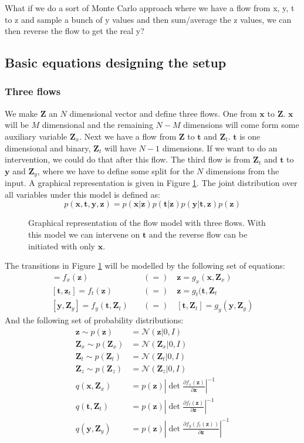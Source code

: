 \documentclass{article}
\newcommand{\Norm}{\mathcal{N}}
\newcommand{\bt}{\mathbf{t}}
\newcommand{\bx}{\mathbf{x}}
\newcommand{\by}{\mathbf{y}}
\newcommand{\bZ}{\mathbf{Z}}
\newcommand{\bz}{\mathbf{z}}
\newcommand{\parfrac}[2]{\frac{\partial #1}{\partial#2}}
\begin{document}
What if we do a sort of Monte Carlo approach where we have a flow from x, y, t to z and sample a bunch of y values and then sum/average the z values, we can then reverse the flow to get the real y?


\newpage
\subsection{Basic equations designing the setup}
\subsubsection{Three flows}
We make $\bZ$ an $N$ dimensional vector and define three flows. One from $\bx$ to $\bZ$. $\bx$ will be $M$ dimensional and the remaining $N-M$ dimensions will come form some auxiliary variable $\bZ_x$. 
Next we have a flow from $\bZ$ to $\bt$ and $\bZ_t$. $\bt$ is one dimensional and binary, $\bZ_t$ will have $N-1$ dimensions. If we want to do an intervention, we could do that after this flow. The third flow is from $\bZ_t$ and $\bt$ to $\by$ and $\bZ_y$, where we have to define some split for the $N$ dimensions from the input. A graphical representation is given in Figure \ref{fig:flow_graph_three_flows}. The joint distribution over all variables under this model is defined as:
\begin{equation}
    p(\bx, \bt, \by, \bz) = p(\bx|\bz)p(\bt|\bz)p(\by|\bt, \bz)p(\bz)
\end{equation}


\begin{figure}
    \centering
    
    \caption{Graphical representation of the flow model with three flows. With this model we can intervene on $\bt$ and the reverse flow can be initiated with only $\bx$.}
    \label{fig:flow_graph_three_flows}
\end{figure}

\noindent
The transitions in Figure \ref{fig:flow_graph_three_flows} will be modelled by the following set of equations:
\begin{align}
    [\bz, \bZ_x] = f_x(\bz)\quad &(=) \quad \bz = g_x(\bx, \bZ_x)\\
    [\bt, \bz_t] = f_t(\bz)\quad &(=) \quad \bz = g_t(\bt, \bZ_t\\
    [\by, \bZ_y] = f_y(\bt, \bZ_t)\quad &(=) \quad [\bt, \bZ_t] = g_y(\by, \bZ_y)
\end{align}
\noindent
And the following set of probability distributions:
\begin{align}
    \bz \sim p(\bz) &= \Norm(\bz | 0, I)\\
    \bZ_x \sim p(\bZ_x) &= \Norm(\bZ_x | 0, I)\\
    \bZ_t \sim p(\bZ_t) &= \Norm(\bZ_t | 0, I)\\
    \bZ_z \sim p(\bZ_z) &= \Norm(\bZ_z | 0, I)\\
    q(\bx, \bZ_x) &= p(\bz) \left|\det\parfrac{f_x(\bz)}{\bz}\right|^{-1}\\
    q(\bt, \bZ_t) &= p(\bz) \left|\det\parfrac{f_t(\bz)}{\bz}\right|^{-1}\\
    q(\by, \bZ_y) &= p(\bz) \left|\det\parfrac{f_y(f_t(\bz))}{\bz}\right|^{-1}
\end{align}
\end{document}

